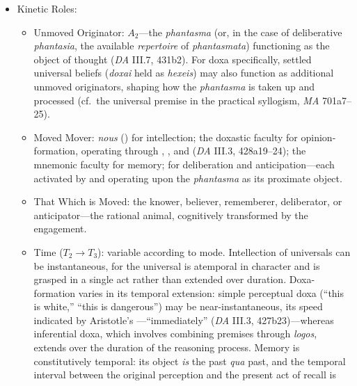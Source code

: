 \begin{itemize}
\begin{itemize}
\begin{itemize}
              \item Kinetic Roles:
              \begin{itemize}
                  \item Unmoved Originator: $A_2$---the \textit{phantasma} (or, in
                  the case of deliberative \textit{phantasia}, the available
                  \textit{repertoire} of \textit{phantasmata}) functioning as the
                  object of thought (\textit{DA} III.7, 431b2). For doxa specifically,
                  settled universal beliefs (\textit{doxai} held as \textit{hexeis})
                  may also function as additional unmoved originators, shaping how the
                  \textit{phantasma} is taken up and processed (cf.\ the universal
                  premise in the practical syllogism, \textit{MA} 701a7--25).
                  \item Moved Mover: \textit{nous} () for intellection; the
                  doxastic faculty for opinion-formation, operating through
                  , , and  (\textit{DA} III.3,
                  428a19--24); the mnemonic faculty for memory;
                   for deliberation and anticipation---each
                  activated by and operating upon the \textit{phantasma} as its
                  proximate object.
                  \item That Which is Moved: the knower, believer, rememberer,
                  deliberator, or anticipator---the rational animal, cognitively
                  transformed by the engagement.
                  \item Time ($T_2 \rightarrow T_3$): variable according to mode.
                  Intellection of universals can be instantaneous, for the universal
                  is atemporal in character and is grasped in a single act rather than
                  extended over duration. Doxa-formation varies in its temporal
                  extension: simple perceptual doxa (``this is white,'' ``this is
                  dangerous'') may be near-instantaneous, its speed indicated by
                  Aristotle's ---``immediately'' (\textit{DA} III.3,
                  427b23)---whereas inferential doxa, which involves combining
                  premises through \textit{logos}, extends over the duration of the
                  reasoning process. Memory is constitutively temporal: its object
                  \textit{is} the past \textit{qua} past, and the temporal interval
                  between the original perception and the present act of recall is

\end{itemize}
\end{itemize}
\end{itemize}
\end{itemize}
